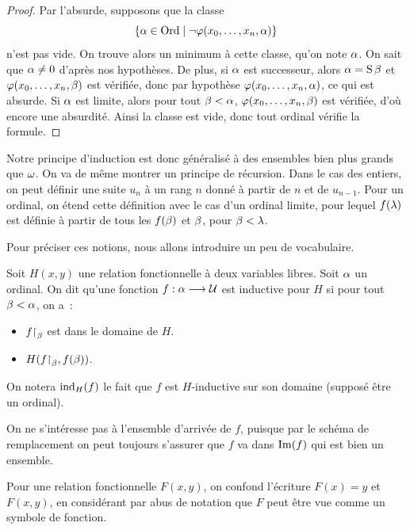 \begin{proof}
  Par l'absurde, supposons que la classe
  \[\left\{ \alpha \in\operatorname{Ord} \;\middle\vert\; \lnot\varphi(x_0,\ldots,x_n,\alpha) \right\}\]
  n'est pas vide. On trouve alors un minimum à cette classe, qu'on note
  $\alpha$. On sait que $\alpha \neq 0$ d'après nos hypothèses. De plus, si
  $\alpha$ est successeur, alors $\alpha = \operatorname{S}\beta$ et
  $\varphi(x_0,\ldots,x_n,\beta)$ est vérifiée, donc par hypothèse
  $\varphi(x_0,\ldots,x_n,\alpha)$, ce qui est absurde. Si $\alpha$ est limite,
  alors pour tout $\beta < \alpha$, $\varphi(x_0,\ldots,x_n,\beta)$ est
  vérifiée, d'où encore une absurdité.
  Ainsi la classe est vide, donc tout ordinal vérifie la formule.
\end{proof}

Notre principe d'induction est donc généralisé à des ensembles bien plus grands
que $\omega$. On va de même montrer un principe de récursion. Dans le cas des
entiers, on peut définir une suite $u_n$ à un rang $n$ donné à partir de $n$ et
de $u_{n-1}$. Pour un ordinal, on étend cette définition avec le cas d'un
ordinal limite, pour lequel $f(\lambda)$ est définie à partir de tous les
$f(\beta)$ et $\beta$, pour $\beta < \lambda$.

Pour préciser ces notions, nous allons introduire un peu de vocabulaire.

\begin{definition}
  Soit $H(x,y)$ une relation fonctionnelle à deux variables libres. Soit
  $\alpha$ un ordinal. On dit qu'une fonction $f : \displaystyle \alpha \longrightarrow \mathcal{U}$
  est inductive pour $H$ si pour tout $\beta < \alpha$, on a~:
  \begin{itemize}
  \item $f\mathbin{\upharpoonright}_{\beta}$ est dans le domaine de $H$.
  \item $H(f\mathbin{\upharpoonright}_{\beta},f(\beta))$.
  \end{itemize}
  On notera $\operatorname{ind}_H(f)$ le fait que $f$ est $H$-inductive sur son domaine
  (supposé être un ordinal).
\end{definition}

\begin{remark}
  On ne s'intéresse pas à l'ensemble d'arrivée de $f$, puisque par le schéma de
  remplacement on peut toujours s'assurer que $f$ va dans $\operatorname{Im}(f)$ qui est bien
  un ensemble.
\end{remark}

\begin{notation}
  Pour une relation fonctionnelle $F(x,y)$, on confond l'écriture $F(x) = y$ et
  $F(x,y)$, en considérant par abus de notation que $F$ peut être vue comme un
  symbole de fonction.
\end{notation}

